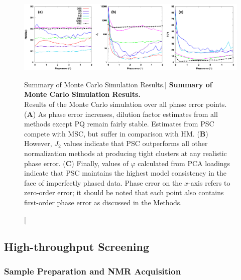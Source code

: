 \begin{figure}[ht!]
\includegraphics[width=6.5in]{figs/pscorr/04-montecarlo.png}
\caption
      [Summary of Monte Carlo Simulation Results.]{
  {\bf Summary of Monte Carlo Simulation Results.}
  \\
  Results of the Monte Carlo simulation over all phase error points.
  ({\bf A}) As phase error increases, dilution factor estimates from all
  methods except PQ remain fairly stable. Estimates from PSC compete with
  MSC, but suffer in comparison with HM.
  ({\bf B}) However, $J_2$ values indicate that PSC outperforms all other
  normalization methods at producing tight clusters at any realistic
  phase error.
  ({\bf C}) Finally, values of $\varphi$ calculated from PCA loadings indicate
  that PSC maintains the highest model consistency in the face of imperfectly
  phased data. Phase error on the $x$-axis refers to zero-order error; it
  should be noted that each point also contains first-order phase error as
  discussed in the Methods.
}
\end{figure}

\subsection{High-throughput Screening}

\subsubsection{Sample Preparation and NMR Acquisition}


